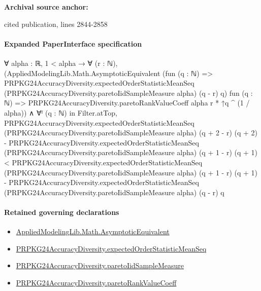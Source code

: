 \documentclass[10pt]{article}
\begin{document}
\textbf{Archival source anchor:} {\footnotesize\raggedright cited publication, lines 2844-\allowbreak{}2858\par}
\paragraph{Expanded PaperInterface specification}
\begin{ReviewVerbatim}
∀ {alpha : ℝ},
  1 < alpha →
    ∀ (r : ℕ),
      (AppliedModelingLib.Math.AsymptoticEquivalent
          (fun (q : ℕ) =>
            PRPKG24AccuracyDiversity.expectedOrderStatisticMeanSeq
              (PRPKG24AccuracyDiversity.paretoIidSampleMeasure alpha) (q - r) q)
          fun (q : ℕ) => PRPKG24AccuracyDiversity.paretoRankValueCoeff alpha r * ↑q ^ (1 / alpha)) ∧
        ∀ᶠ (q : ℕ) in Filter.atTop,
          PRPKG24AccuracyDiversity.expectedOrderStatisticMeanSeq (PRPKG24AccuracyDiversity.paretoIidSampleMeasure alpha)
                (q + 2 - r) (q + 2) -
              PRPKG24AccuracyDiversity.expectedOrderStatisticMeanSeq
                (PRPKG24AccuracyDiversity.paretoIidSampleMeasure alpha) (q + 1 - r) (q + 1) <
            PRPKG24AccuracyDiversity.expectedOrderStatisticMeanSeq
                (PRPKG24AccuracyDiversity.paretoIidSampleMeasure alpha) (q + 1 - r) (q + 1) -
              PRPKG24AccuracyDiversity.expectedOrderStatisticMeanSeq
                (PRPKG24AccuracyDiversity.paretoIidSampleMeasure alpha) (q - r) q
\end{ReviewVerbatim}

\paragraph{Retained governing declarations}
\begin{itemize}\raggedright
\item \hyperlink{governing-declaration-4f7a9039c890ef63}{Applied\allowbreak{}Modeling\allowbreak{}Lib.\allowbreak{}Math.\allowbreak{}Asymptotic\allowbreak{}Equivalent}
\item \hyperlink{governing-declaration-9ae5c6cf4ac37116}{PRPKG24\allowbreak{}Accuracy\allowbreak{}Diversity.\allowbreak{}expected\allowbreak{}Order\allowbreak{}Statistic\allowbreak{}Mean\allowbreak{}Seq}
\item \hyperlink{governing-declaration-ea124ab678db9ab9}{PRPKG24\allowbreak{}Accuracy\allowbreak{}Diversity.\allowbreak{}pareto\allowbreak{}Iid\allowbreak{}Sample\allowbreak{}Measure}
\item \hyperlink{governing-declaration-55b1926dc2d9e50a}{PRPKG24\allowbreak{}Accuracy\allowbreak{}Diversity.\allowbreak{}pareto\allowbreak{}Rank\allowbreak{}Value\allowbreak{}Coeff}
\end{itemize}
\end{document}
